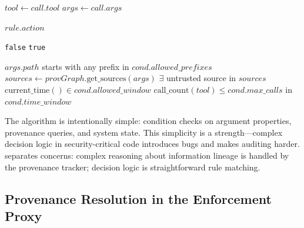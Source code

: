 \begin{algorithm}[t]
\caption{Policy Evaluation Algorithm}
\label{alg:policy}
\begin{algorithmic}[1]
  \State $tool \gets call.tool$
  \State $args \gets call.args$
  
    
        \State \Return $rule.action$  
      \EndIf
    \EndIf
  \EndFor
  
  \State \Return {}  
\EndProcedure

      \State \Return \texttt{false}  
    \EndIf
  \EndFor
  \State \Return \texttt{true}
\EndProcedure

    \State \Return $args.path$ starts with any prefix in $cond.allowed\_prefixes$
    \State $sources \gets provGraph.\text{get\_sources}(args)$
      \State \Return {}
    \Else
      \State \Return $\exists$ untrusted source in $sources$
    \EndIf
    \State \Return $\text{current\_time}() \in cond.allowed\_window$
    \State \Return $\text{call\_count}(tool) \leq cond.max\_calls$ in $cond.time\_window$
  \EndIf
\EndProcedure
\end{algorithmic}
\end{algorithm}

The algorithm is intentionally simple: condition checks on argument properties, provenance queries, and system state. This simplicity is a strength—complex decision logic in security-critical code introduces bugs and makes auditing harder. \sys{} separates concerns: complex reasoning about information lineage is handled by the provenance tracker; decision logic is straightforward rule matching.

\subsection{Provenance Resolution in the Enforcement Proxy}

